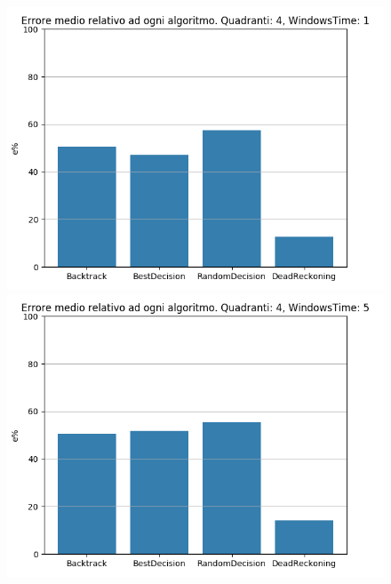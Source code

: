 \documentclass[12pt,a4paper,openright,twoside]{report}
\begin{document}
\begin{figure}[H]
\centering 
\includegraphics[scale=0.4]{secondChart4-1} 
\includegraphics[scale=0.4]{secondChart4-5} 
\end{figure}
\end{document}
